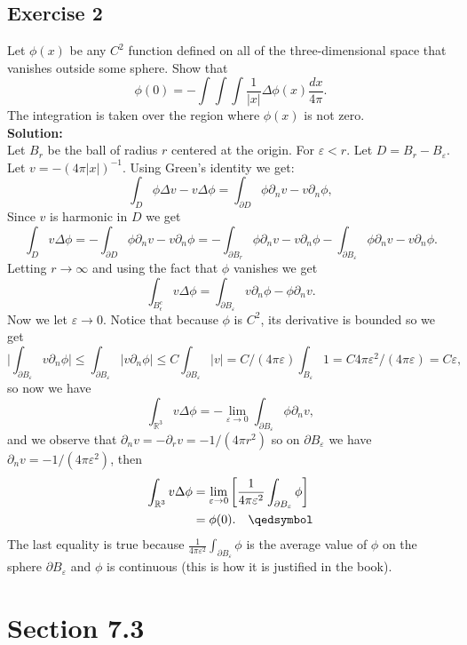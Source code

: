 \documentclass[12pt]{article}%
\begin{document}
\subsection*{Exercise 2}
Let $\phi(x)$ be any $C^2$ function defined on all of the three-dimensional
space that vanishes outside some sphere. Show that
\[
    \phi(0)=-\int\int\int \frac{1}{|x|}\Delta \phi(x) \frac{dx}{4\pi}.
\]
The integration is taken over the region where $\phi(x)$ is not zero.\\
\textbf{Solution:}\\
Let $B_r$ be the ball of radius $r$ centered at the origin. For
$\varepsilon<r$. Let $D=B_r-B_\varepsilon$.\\
Let $v=-(4\pi|x|)^{-1}$. Using Green's identity we get:
\[
    \int_D \phi\Delta v  - v \Delta \phi = \int_{\partial D} \phi \partial_n v
    - v \partial_n \phi,
\]
Since $v$ is harmonic in $D$ we get
\[
    \int_D v \Delta \phi = -\int_{\partial D} \phi \partial_n v - v \partial_n \phi = -
    \int_{\partial B_r} \phi \partial_n v - v \partial_n \phi - \int_{\partial
    B_\varepsilon} \phi \partial_n v - v \partial_n \phi.
\]
Letting $r\to \infty$ and using the fact that $\phi$ vanishes we get
\[
    \int_{B_\epsilon^c}v\Delta\phi = \int_{\partial B_\varepsilon}
    v\partial_n \phi - \phi \partial_n v.
\]
Now we let $\varepsilon \to 0$. Notice that because $\phi$ is $C^2$, its
derivative is bounded so we get
\[
    \bigg| \int_{\partial B_\varepsilon} v\partial_n \phi\bigg|
    \leq \int_{\partial B_\varepsilon} |v\partial_n \phi|
    \leq C \int_{\partial B_\varepsilon}|v| =
    C/(4\pi\varepsilon)\int_{B_\varepsilon}1=C4\pi\varepsilon^2/(4\pi\varepsilon)
    = C\varepsilon,
\]
so now we have
\[
    \int_{\mathbb{R}^3}v\Delta\phi = -\lim_{\varepsilon\to0}\int_{\partial B_\varepsilon}\phi\partial_n v,
\]
and we observe that $\partial_n v=-\partial_r v= -1/(4\pi r^2)$ so on
$\partial B_\varepsilon$ we have $\partial_n v = -1/(4\pi\varepsilon^2)$, then
\begin{align*}
    \int_{\mathbb{R}^3}v\Delta\phi &=
    \lim_{\varepsilon\to0}\left[\frac{1}{4\pi\varepsilon^2}\int_{\partial
    B_\varepsilon}\phi\right]\\
    &=\phi(0). \quad \qedsymbol
\end{align*}
The last equality is true because $\frac{1}{4\pi
\varepsilon^2}\int_{\partial B_\varepsilon}\phi$ is the average value of $\phi$
on the sphere $\partial B_\varepsilon$ and $\phi$ is continuous (this is how it
is justified in the book).
\section*{Section 7.3}
\end{document}
